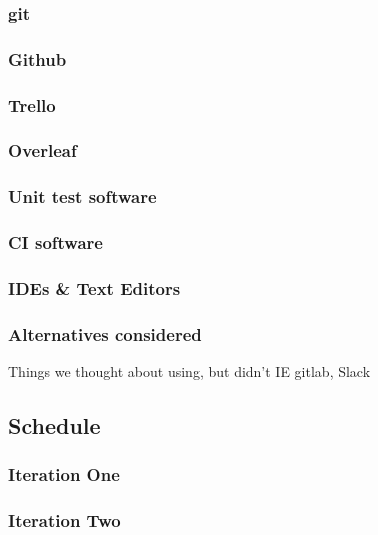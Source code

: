 \documentclass[a4paper]{article}
\begin{document}
\subsubsection{git}

\subsubsection{Github}

\subsubsection{Trello}

\subsubsection{Overleaf}

\subsubsection{Unit test software}

\subsubsection{CI software}

\subsubsection{IDEs & Text Editors}

\subsubsection{Alternatives considered}
Things we thought about using, but didn't IE gitlab, Slack

\subsection{Schedule}%

\subsubsection{Iteration One}

\subsubsection{Iteration Two}
\end{document}
